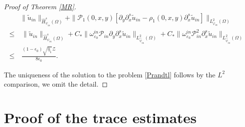 \documentclass{amsart}
\numberwithin{equation}{section}
\begin{document}
\begin{proof}[Proof of Theorem \ref{MR}]
\begin{align}
&\|\tilde{u}_{in}\|_{\hat{H}_{\psi_{in}}^{s}(\Omega)}
+\|\mathcal{P}_{1}(0,x,y)[\partial_{y}\partial_{x}^{s}\tilde{u}_{in}-\rho_{1}(0,x,y)\partial_{x}^{s}\tilde{u}_{in}]\|_{L_{\varphi_{in}}^{2}(\Omega)}\\
\leq&~\|\tilde{u}_{in}\|_{\hat{H}_{\psi_{in}}^{s}(\Omega)}
     +C_{*}\|\omega_{\varepsilon_{0}}^{in}\mathcal{P}_{in}\partial_{y}\partial_{x}^{s}\tilde{u}_{in}\|_{L_{\hat{\psi}_{in}}^{2}(\Omega)}
     +C_{*}\|\omega_{\varepsilon_{0}}^{in}\mathcal{P}_{in}^{2}\partial_{x}^{s}\tilde{u}_{in}\|_{L_{\hat{\psi}_{in}}^{2}(\Omega)}\nonumber\\
\leq&~\frac{(1-\epsilon_{0})\sqrt{\bar{\eta}_{1}}\mathcal{Z}}{8\epsilon_{0}}.\nonumber
\end{align}

The uniqueness of the solution to the problem \eqref{Prandtl} follows by the $L^{2}$ comparison, we omit the detail.
\end{proof}


\appendix

\section{Proof of the trace estimates}
\end{document}
